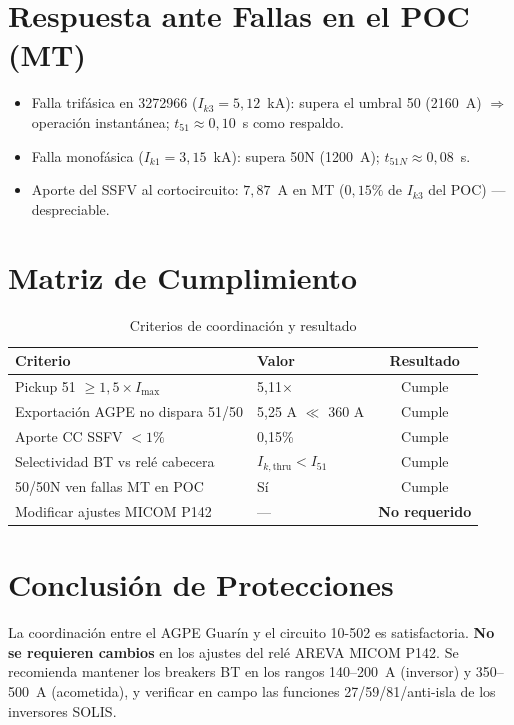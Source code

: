 \section{Respuesta ante Fallas en el POC (MT)}

\begin{itemize}
    \item Falla trifásica en 3272966 ($I_{k3}=5{,}12$~kA): supera el umbral 50 (2160~A) $\Rightarrow$ operación instantánea; $t_{51}\approx 0{,}10$~s como respaldo.
    \item Falla monofásica ($I_{k1}=3{,}15$~kA): supera 50N (1200~A); $t_{51N}\approx 0{,}08$~s.
    \item Aporte del SSFV al cortocircuito: $7{,}87$~A en MT ($0{,}15\%$ de $I_{k3}$ del POC) --- despreciable.
\end{itemize}

\section{Matriz de Cumplimiento}

\begin{table}[H]
    \centering
    \caption{Criterios de coordinación y resultado}
    \begin{tabular}{llc}
    \toprule
    \textbf{Criterio} & \textbf{Valor} & \textbf{Resultado} \\
    \midrule
    Pickup 51 $\geq 1{,}5\times I_{\max}$ & 5,11$\times$ & Cumple \\
    Exportación AGPE no dispara 51/50 & 5,25 A $\ll$ 360 A & Cumple \\
    Aporte CC SSFV $< 1\%$ & 0,15\% & Cumple \\
    Selectividad BT vs relé cabecera & $I_{k,\mathrm{thru}}<I_{51}$ & Cumple \\
    50/50N ven fallas MT en POC & Sí & Cumple \\
    Modificar ajustes MICOM P142 & --- & \textbf{No requerido} \\
    \bottomrule
    \end{tabular}
\end{table}

\section{Conclusión de Protecciones}

La coordinación entre el AGPE Guarín y el circuito 10-502 es satisfactoria. \textbf{No se requieren cambios} en los ajustes del relé AREVA MICOM P142. Se recomienda mantener los breakers BT en los rangos 140--200~A (inversor) y 350--500~A (acometida), y verificar en campo las funciones 27/59/81/anti-isla de los inversores SOLIS.
